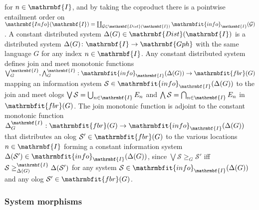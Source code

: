 \documentclass{amsart}
\theoremstyle{remark}
\theoremstyle{definition}
\begin{document}
for $n \in \mathrmbf{I}$,
and by taking the coproduct
there is a pointwise entailment order on
$\mathrmbf{Info}(\mathrmbf{I}) = \coprod_{\mathcal{G} \in \mathrmbf{Dist}(\mathrmbf{I})}\mathrmbfit{info}_{\mathrmbf{I}}(\mathcal{G})$.
%
A constant distributed system 
$\Delta(G) \in \mathrmbf{Dist}(\mathrmbf{I})$
is a distributed system
$\Delta(G) \colon \mathrmbf{I} \rightarrow \mathrmbf{Gph}$
with the same language $G$ for any index $n \in \mathrmbf{I}$.
Any constant distributed system defines join and meet monotonic functions
$\bigvee^{\mathrmbf{I}}_{G},\bigwedge^{\mathrmbf{I}}_{G} 
: \mathrmbfit{info}_{\mathrmbf{I}}(\Delta(G)) \rightarrow \mathrmbfit{fbr}(G)$
mapping an information system 
$\mathcal{S} \in \mathrmbfit{info}_{\mathrmbf{I}}(\Delta(G))$ 
to the join and meet ologs
$\bigvee\mathcal{S} = \bigcup_{n \in \mathrmbf{I}} E_{n}$ and
$\bigwedge\mathcal{S} = \bigcap_{n \in \mathrmbf{I}} E_{n}$
in $\mathrmbfit{fbr}(G)$.
%
The join monotonic function is adjoint to the constant monotonic function
$\Delta^{\mathrmbf{I}}_{G} 
: \mathrmbfit{fbr}(G) \rightarrow \mathrmbfit{info}_{\mathrmbf{I}}(\Delta(G))$
that distributes an olog $\mathcal{S}' \in \mathrmbfit{fbr}(G)$
to the various locations $n \in \mathrmbf{I}$
forming a constant information system $\Delta(\mathcal{S}') \in \mathrmbfit{info}_{\mathrmbf{I}}(\Delta(G))$,
since
$\bigvee\mathcal{S} \geq_{G} \mathcal{S}'$
iff
$\mathcal{S} \geq^{\mathrmbf{I}}_{\Delta(G)} \Delta(\mathcal{S}')$
for any system $\mathcal{S} \in \mathrmbfit{info}_{\mathrmbf{I}}(\Delta(G))$ 
and any olog $\mathcal{S}' \in \mathrmbfit{fbr}(G)$.

\subsubsection{System morphisms}
\end{document}
